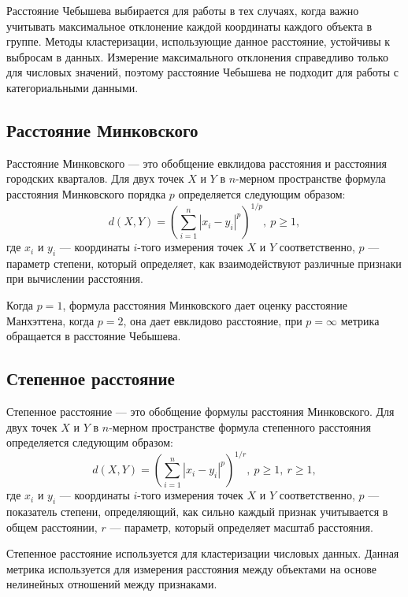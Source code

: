 Расстояние Чебышева выбирается для работы в тех случаях, когда важно учитывать максимальное отклонение каждой координаты каждого объекта в группе. Методы кластеризации, использующие данное расстояние, устойчивы к выбросам в данных. Измерение максимального отклонения справедливо только для числовых значений, поэтому расстояние Чебышева не подходит для работы с категориальными данными.

\subsection{Расстояние Минковского}

Расстояние Минковского \cite{MinkowskiDistance} --- это обобщение евклидова расстояния и расстояния городских кварталов. Для двух точек $X$ и $Y$ в $n$-мерном пространстве формула расстояния Минковского порядка $p$ определяется следующим образом:
\begin{equation}
    d(X,Y) = \left( \sum_{i=1}^{n} |x_i - y_i|^p \right)^{1/p},\ p \geq 1, 
\end{equation}
где $x_i$ и $y_i$ --- координаты $i$-того измерения точек $X$ и $Y$ соответственно, $p$ --- параметр степени, который определяет, как взаимодействуют различные признаки при вычислении расстояния.

Когда $p=1$, формула расстояния Минковского дает оценку расстояние Манхэттена, когда $p=2$, она дает евклидово расстояние, при $p=\infty$ метрика обращается в расстояние Чебышева.

\subsection{Степенное расстояние}

Степенное расстояние \cite{AnalysisСlusteringAlgorithms} --- это обобщение формулы расстояния Минковского. Для двух точек $X$ и $Y$ в $n$-мерном пространстве формула степенного расстояния определяется следующим образом:
\begin{equation}
    d(X,Y) = \left( \sum_{i=1}^{n} |x_i - y_i|^p \right)^{1/r},\ p \geq 1,\ r \geq 1, 
\end{equation}
где $x_i$ и $y_i$ --- координаты $i$-того измерения точек $X$ и $Y$ соответственно, $p$ --- показатель степени, определяющий, как сильно каждый признак учитывается в общем расстоянии, $r$ --- параметр, который определяет масштаб расстояния.

Степенное расстояние используется для кластеризации числовых данных. Данная метрика используется для измерения расстояния между объектами на основе нелинейных отношений между признаками. 

